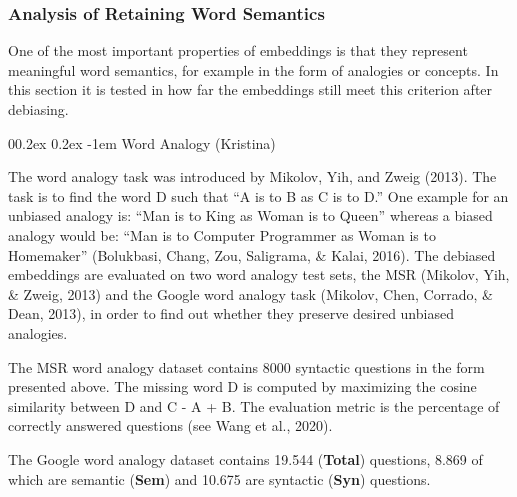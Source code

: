 \documentclass[
  english,
  man,floatsintext]{apa6}
\makeatletter
\let\oldparagraph\paragraph
\renewcommand{\paragraph}[1]{\oldparagraph{#1}\mbox{}}
\renewcommand{\paragraph}{\@startsection{paragraph}{4}{\parindent}%
  {0\baselineskip \@plus 0.2ex \@minus 0.2ex}%
  {-1em}%
  {\normalfont\normalsize\bfseries\itshape\typesectitle}}
\makeatother
\begin{document}
\hypertarget{analysis-of-retaining-word-semantics}{%
\subsubsection{Analysis of Retaining Word Semantics}\label{analysis-of-retaining-word-semantics}}

One of the most important properties of embeddings is that they represent meaningful word semantics, for example in the form of analogies or concepts. In this section it is tested in how far the embeddings still meet this criterion after debiasing.

\hypertarget{word-analogy-kristina}{%
\paragraph{Word Analogy (Kristina)}\label{word-analogy-kristina}}

The word analogy task was introduced by Mikolov, Yih, and Zweig (2013). The task is to find the word D such that ``A is to B as C is to D.'' One example for an unbiased analogy is: ``Man is to King as Woman is to Queen'' whereas a biased analogy would be: ``Man is to Computer Programmer as Woman is to Homemaker'' (Bolukbasi, Chang, Zou, Saligrama, \& Kalai, 2016). The debiased embeddings are evaluated on two word analogy test sets, the MSR (Mikolov, Yih, \& Zweig, 2013) and the Google word analogy task (Mikolov, Chen, Corrado, \& Dean, 2013), in order to find out whether they preserve desired unbiased analogies.

The MSR word analogy dataset contains 8000 syntactic questions in the form presented above. The missing word D is computed by maximizing the cosine similarity between D and C - A + B. The evaluation metric is the percentage of correctly answered questions (see Wang et al., 2020).

The Google word analogy dataset contains 19.544 (\textbf{Total}) questions, 8.869 of which are semantic (\textbf{Sem}) and 10.675 are syntactic (\textbf{Syn}) questions.
\end{document}
